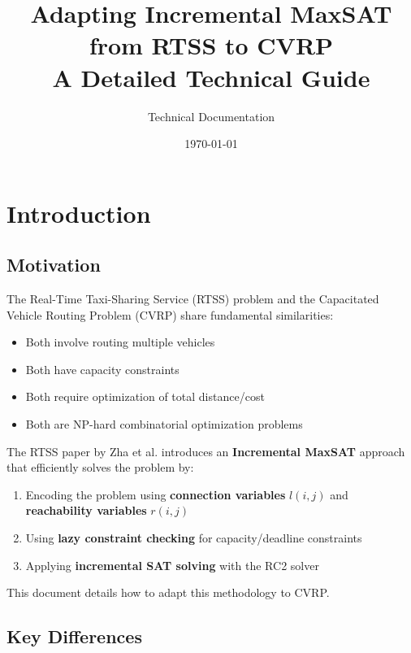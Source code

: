 \documentclass[12pt,a4paper]{article}
\title{\textbf{Adapting Incremental MaxSAT from RTSS to CVRP}\\[1em]
\large A Detailed Technical Guide}
\author{Technical Documentation}
\date{\today}
\theoremstyle{definition}
\begin{document}
\maketitle

\tableofcontents
\newpage

\section{Introduction}

\subsection{Motivation}

The Real-Time Taxi-Sharing Service (RTSS) problem and the Capacitated Vehicle Routing Problem (CVRP) share fundamental similarities:
\begin{itemize}
    \item Both involve routing multiple vehicles
    \item Both have capacity constraints
    \item Both require optimization of total distance/cost
    \item Both are NP-hard combinatorial optimization problems
\end{itemize}

The RTSS paper by Zha et al. introduces an \textbf{Incremental MaxSAT} approach that efficiently solves the problem by:
\begin{enumerate}
    \item Encoding the problem using \textbf{connection variables} $l(i,j)$ and \textbf{reachability variables} $r(i,j)$
    \item Using \textbf{lazy constraint checking} for capacity/deadline constraints
    \item Applying \textbf{incremental SAT solving} with the RC2 solver
\end{enumerate}

This document details how to adapt this methodology to CVRP.

\subsection{Key Differences}
\end{document}
